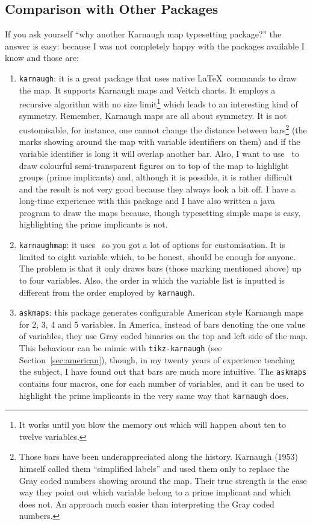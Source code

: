 \documentclass[a4paper]{ltxdoc}
\begin{document}
\subsection{Comparison with Other Packages}

If you ask yourself ``why another Karnaugh map typesetting package?'' the answer is easy: because I was not completely happy with the packages available I know and those are:
\begin{enumerate}
\item \verb|karnaugh|: it is a great package that uses native \LaTeX\ commands to draw the map. It supports Karnaugh maps and Veitch charts. It employs a recursive algorithm with no size limit\footnote{It works until you blow the memory out which will happen about ten to twelve variables.} which leads to an interesting kind of symmetry. Remember, Karnaugh maps are all about symmetry. It is not customisable, for instance, one cannot change the distance between bars\footnote{Those bars have been underappreciated along the history. Karnaugh (1953) himself called them ``simplified labels'' and used them only to replace the Gray coded numbers showing around the map. Their true strength is the ease way they point out which variable belong to a prime implicant and which does not. An approach much easier than interpreting the Gray coded numbers.} (the marks showing around the map with variable identifiers on them) and if the variable identifier is long it will overlap another bar. Also, I want to use \tikzname\ to draw colourful semi-transparent figures on to top of the map to highlight groups (prime implicants) and, although it is possible, it is rather difficult and the result is not very good because they always look a bit off. I have a long-time experience with this package and I have also written a java program to draw the maps because, though typesetting simple maps is easy, highlighting the prime implicants is not.
\item \verb|karnaughmap|: it uses \tikzname\ so you got a lot of options for customisation. It is limited to eight variable which, to be honest, should be enough for anyone. The problem is that it only draws bars (those marking mentioned above) up to four variables. Also, the order in which the variable list is inputted is different from the order employed by \verb|karnaugh|.
\item \verb|askmaps|: this package generates configurable American style Karnaugh maps for 2, 3, 4 and 5 variables. In America, instead of bars denoting the one value of variables, they use Gray coded binaries on the top and left side of the map. This behaviour can be mimic with \verb|tikz-karnaugh| (see Section~\ref{sec:american}), though, in my twenty years of experience teaching the subject, I have found out that bars are much more intuitive. The \verb|askmaps| contains four macros, one for each number of variables, and it can be used to highlight the prime implicants in the very same way that \verb|karnaugh| does.

\end{enumerate}
\end{document}
